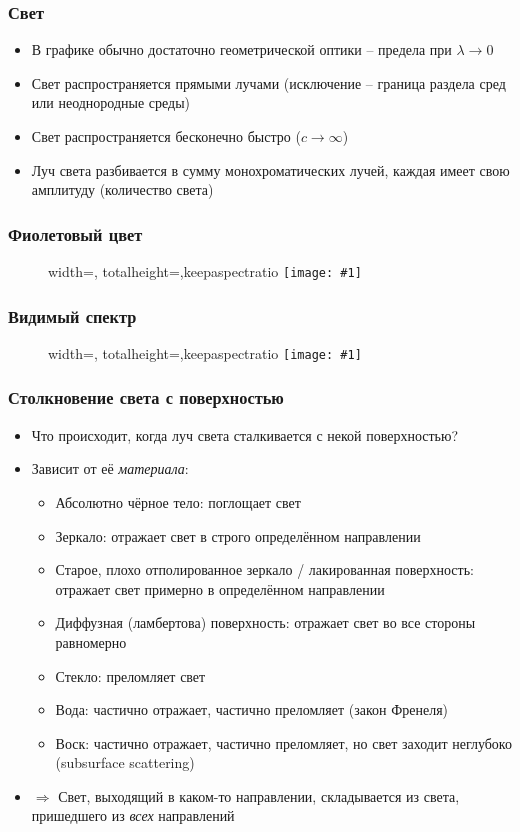 \documentclass{beamer}
\newcommand{\slideimage}[1]{
  \begin{figure}
    \begin{adjustbox}{width=\textwidth, totalheight=\textheight-2\baselineskip-2\baselineskip,keepaspectratio}
      \texttt{[image: \#1]}
    \end{adjustbox}
  \end{figure}
}
\begin{document}
\begin{frame}[fragile]
\frametitle{Свет}
\begin{itemize}
\item В графике обычно достаточно геометрической оптики -- предела при \begin{math}\lambda\rightarrow 0\end{math}
\pause
\item Свет распространяется прямыми лучами (исключение -- граница раздела сред или неоднородные среды)
\item Свет распространяется бесконечно быстро (\begin{math}c \rightarrow \infty\end{math})
\item Луч света разбивается в сумму монохроматических лучей, каждая имеет свою амплитуду (количество света)
\end{itemize}
\end{frame}

\begin{frame}[fragile]
\frametitle{Фиолетовый цвет}
\slideimage{blue-red-spectrum.png}
\end{frame}

\begin{frame}[fragile]
\frametitle{Видимый спектр}
\slideimage{visible-spectrum.jpg}
\end{frame}

\begin{frame}[fragile]
\frametitle{Столкновение света с поверхностью}
\begin{itemize}
\item Что происходит, когда луч света сталкивается с некой поверхностью?
\pause
\item Зависит от её \textit{материала}:
\pause
\begin{itemize}
\item Абсолютно чёрное тело: поглощает свет
\pause
\item Зеркало: отражает свет в строго определённом направлении
\pause
\item Старое, плохо отполированное зеркало / лакированная поверхность: отражает свет примерно в определённом направлении
\pause
\item Диффузная (ламбертова) поверхность: отражает свет во все стороны равномерно
\pause
\item Стекло: преломляет свет
\pause
\item Вода: частично отражает, частично преломляет (закон Френеля)
\pause
\item Воск: частично отражает, частично преломляет, но свет заходит неглубоко (subsurface scattering)
\end{itemize}
\pause
\item \begin{math}\Rightarrow\end{math} Свет, выходящий в каком-то направлении, складывается из света, пришедшего из \textit{всех} направлений
\end{itemize}
\end{frame}
\end{document}

